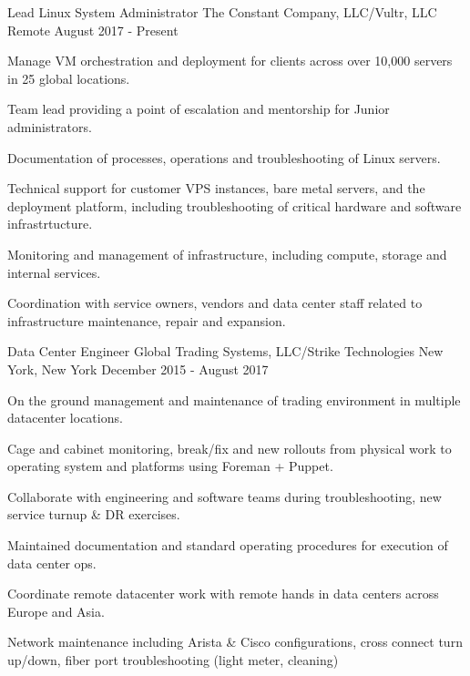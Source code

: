 
\begin{cventries}

	\cventry
	{Lead Linux System Administrator}
	{The Constant Company, LLC/Vultr, LLC}
	{Remote}
	{August 2017 - Present}
	{
		\begin{cvitems}
		\item {Manage VM orchestration and deployment for clients across over 10,000 servers in 25 global locations.}
		\item {Team lead providing a point of escalation and mentorship for Junior administrators.}
		\item {Documentation of processes, operations and troubleshooting of Linux servers.}
		\item {Technical support for customer VPS instances, bare metal servers, and the deployment platform, including troubleshooting of critical hardware and software infrastrtucture.}
		\item {Monitoring and management of infrastructure, including compute, storage and internal services.}
		\item {Coordination with service owners, vendors and data center staff related to infrastructure maintenance, repair and expansion.}
		\end{cvitems}
	}


	\cventry
	{Data Center Engineer}
	{Global Trading Systems, LLC/Strike Technologies}
	{New York, New York}
	{December 2015 - August 2017}
	{
		\begin{cvitems}
		\item {On the ground management and maintenance of trading environment in multiple datacenter locations.}
		\item {Cage and cabinet monitoring, break/fix and new rollouts from physical work to operating system and platforms using Foreman + Puppet.}
		\item {Collaborate with engineering and software teams during troubleshooting, new service turnup & DR exercises.}
		\item {Maintained documentation and standard operating procedures for execution of data center ops.}
		\item {Coordinate remote datacenter work with remote hands in data centers across Europe and Asia.}
		\item {Network maintenance including Arista & Cisco configurations, cross connect turn up/down, fiber port troubleshooting (light meter, cleaning)}
		\end{cvitems}
	}


\end{cventries}
